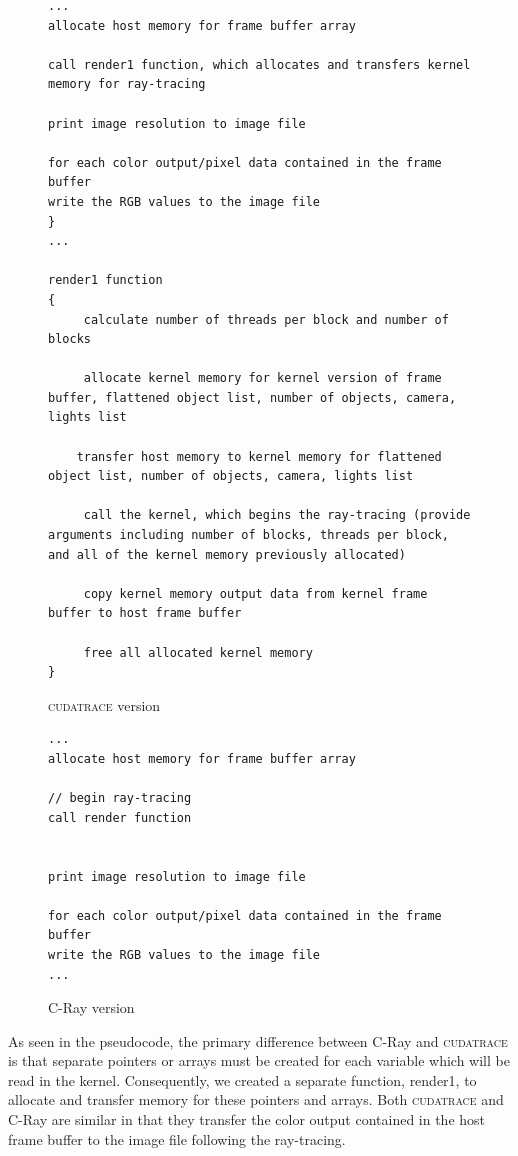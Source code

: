 \documentclass[12pt]{article}
\begin{document}
\begin{figure}[H]
    \caption{\textsc{cudatrace} version} \label{code:cudatrace_basic}
\begin{lstlisting}
...
allocate host memory for frame buffer array

call render1 function, which allocates and transfers kernel memory for ray-tracing
 
print image resolution to image file

for each color output/pixel data contained in the frame buffer
write the RGB values to the image file
}
...

render1 function
{
     calculate number of threads per block and number of blocks
  
     allocate kernel memory for kernel version of frame buffer, flattened object list, number of objects, camera, lights list    
    
    transfer host memory to kernel memory for flattened object list, number of objects, camera, lights list

     call the kernel, which begins the ray-tracing (provide arguments including number of blocks, threads per block, and all of the kernel memory previously allocated)

     copy kernel memory output data from kernel frame buffer to host frame buffer

     free all allocated kernel memory
}  

\end{lstlisting}
\end{figure}

\begin{figure}[H]
    \caption{C-Ray version} \label{code:c-ray_basic}
\begin{lstlisting}
...
allocate host memory for frame buffer array

// begin ray-tracing
call render function 


print image resolution to image file

for each color output/pixel data contained in the frame buffer
write the RGB values to the image file
...
\end{lstlisting}
\end{figure}

As seen in the pseudocode, the primary difference between C-Ray and \textsc{cudatrace} is that separate pointers or arrays must be created for each variable which will be read in the kernel. Consequently, we created a separate function, render1, to allocate and transfer memory for these pointers and arrays. Both \textsc{cudatrace} and C-Ray are similar in that they transfer the color output contained in the host frame buffer to the image file following the ray-tracing. 
\end{document}
